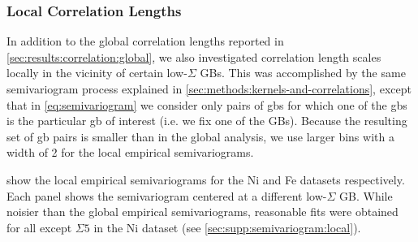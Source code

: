 \documentclass[final,twocolumn,12pt]{elsarticle}
\begin{document}
    \subsubsection{Local Correlation Lengths} \label{sec:results:correlation:local}
    
    In addition to the global correlation lengths reported in \cref{sec:results:correlation:global}, we also investigated correlation length scales locally in the vicinity of certain low-$\Sigma$ GBs. This was accomplished by the same semivariogram process explained in \cref{sec:methods:kernels-and-correlations}, except that in \cref{eq:semivariogram} we consider only pairs of \glspl{gb} for which one of the \glspl{gb} is the particular \gls{gb} of interest (i.e. we fix one of the GBs). Because the resulting set of \gls{gb} pairs is smaller than in the global analysis, we use larger bins with a width of \SI{2}{\tobydeg} for the local empirical semivariograms.
    
     show the local empirical semivariograms for the Ni and Fe datasets respectively. Each panel shows the semivariogram centered at a different low-$\Sigma$ GB. While noisier than the global empirical semivariograms, reasonable fits were obtained for all except $\Sigma 5$ in the Ni dataset (see \cref{sec:supp:semivariogram:local}).
    
\end{document}
